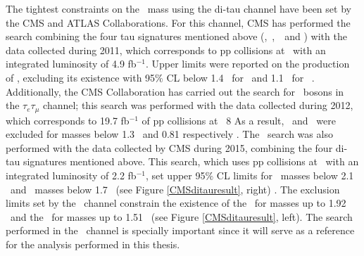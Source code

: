 \begin{itemize}
\noindent The tightest constraints on the \Zprime~mass using the di-tau channel have 
been set by the CMS and ATLAS Collaborations. For this channel, CMS has performed the search combining the four
 tau signatures mentioned above (\tauh \tauh,~\taue \tauh,~\taumu \tauh~and \taue \taumu)
with the data collected during 2011, which corresponds to pp collisions at  \TeV~with 
an integrated luminosity of 4.9 fb$^{-1}$. Upper limits were reported on the production of \Zprime, excluding 
its existence with 95$\%$ CL below 1.4 \TeV~for \ZprimeSSM~and 1.1 \TeV~for \Zprimepsi~\cite{CMSZprimetotautaurun1}. Additionally, 
the CMS Collaboration has carried out the search for \Zprime~bosons in the $\tau_{e}\tau_{\mu}$ channel; this search 
was performed with the data collected during 2012, which corresponds to 19.7 fb$^{-1}$ of pp collisions at \sqrts~8 \TeV
As a result, \ZprimeSSM~and \Zprimepsi~were excluded for masses below 1.3 \TeV~and 0.81 \TeV 
respectively \cite{CMSZprimetotautauemu}. The \Zprimetotautau~search was also performed with the data collected
by CMS during 2015, combining the four di-tau signatures mentioned above. This search, which uses pp collisions 
at  \TeV~with an integrated luminosity of 2.2 fb$^{-1}$, set upper 95$\%$ CL limits for 
\ZprimeSSM~masses below 2.1 \TeV~and \ZprimeTAT~masses below
1.7 \TeV~(see Figure \ref{CMSditauresult}, right) \cite{CMSZprimetotautau2015}. The exclusion limits 
set by the \tauh \tauh~channel constrain the existence of the \ZprimeSSM~for masses up to 
1.92 \TeV~and the \ZprimeTAT~for masses up to 1.51 \TeV~(see Figure \ref{CMSditauresult}, left). The search 
performed in the \tauh\tauh~channel is specially important since it will serve as a reference for the 
analysis performed in this thesis. \\ %


\end{itemize}
